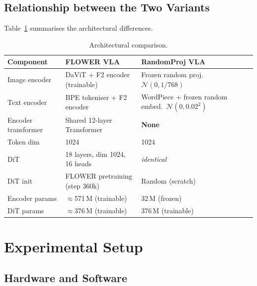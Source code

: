 \documentclass[11pt,a4paper]{article}
\begin{document}
\subsection{Relationship between the Two Variants}

Table~\ref{tab:arch_comparison} summarises the architectural differences.

\begin{table}[h]
\centering
{}
\begin{tabular}{lll}
\toprule
\textbf{Component} & \textbf{FLOWER VLA} & \textbf{RandomProj VLA} \\
\midrule
Image encoder      & DaViT + F2 encoder (trainable) & Frozen random proj.\ $\mathcal{N}(0,1/768)$ \\
Text encoder       & BPE tokeniser + F2 encoder     & WordPiece + frozen random embed.\ $\mathcal{N}(0,0.02^2)$ \\
Encoder transformer & Shared 12-layer Transformer    & \textbf{None} \\
Token dim          & 1024 & 1024 \\
DiT                & 18 layers, dim 1024, 16 heads  & \textit{identical} \\
DiT init           & FLOWER pretraining (step 360k) & Random (scratch) \\
Encoder params     & $\approx$571\,M (trainable)    & 32\,M (frozen) \\
DiT params         & $\approx$376\,M (trainable)    & 376\,M (trainable) \\
\bottomrule
\end{tabular}
\caption{Architectural comparison.}
\label{tab:arch_comparison}
\end{table}

\section{Experimental Setup}
\label{sec:setup}

\subsection{Hardware and Software}
\end{document}
